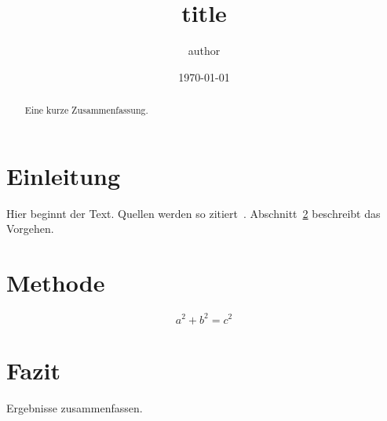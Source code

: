 \documentclass[11pt,a4paper]{scrartcl}
\title{{{title}}}
\author{{{author}}}
\date{\today}
\begin{document}
\maketitle

\begin{abstract}
  Eine kurze Zusammenfassung.
\end{abstract}

\section{Einleitung}
\label{sec:einleitung}
Hier beginnt der Text. Quellen werden so zitiert~\cite{knuth1984}.
Abschnitt~\ref{sec:methode} beschreibt das Vorgehen.

\section{Methode}
\label{sec:methode}
\begin{equation}
  a^2 + b^2 = c^2 \label{eq:pythagoras}
\end{equation}

\section{Fazit}
Ergebnisse zusammenfassen.



\end{document}
